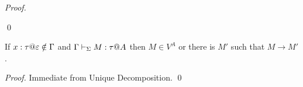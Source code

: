 \begin{proof}
\begin{itemize}
		      	      		      	      	      	      	      	      	      	      	      	      	      	      	      	      	      	      	      	      	      	      	      	      	      	      		      	      	      	      	      	      	      	      
		      		      	      	      	      	      	      	      	      	      	      	      	      		      	      	      	      
		      		      	      	      	      	      	      	      	      	      	      	      	      		      	      	      	      
		      		      	      	      	      	      	      	      	      	      	      	      	      		      	      	      	      
		      		      	      	      	      	      	      	      	      	      	      	      	      		      	      	      	      
	\end{itemize}
\qed\end{proof}

\begin{corollary}[Progress]
	If $x:\tau@\varepsilon \notin \G$ and $\Gamma \vdash_\Sigma M : \tau @ A$ then $ M \in V^A $ or there is $M'$ such that $M \longrightarrow M'$.
\end{corollary}

\begin{proof}
	Immediate from Unique Decomposition.
\qed\end{proof}
	
\endinput
	
